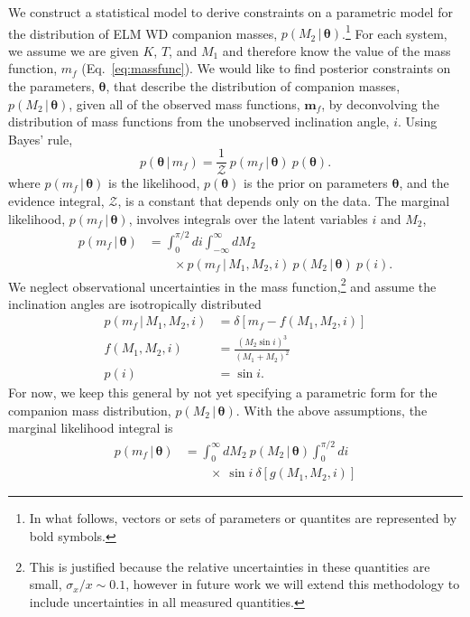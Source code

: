 \documentclass[apjl]{emulateapj}
\newcommand{\given}{\,|\,}
\newcommand{\bs}[1]{\boldsymbol{#1}}
\begin{document}
We construct a statistical model to derive constraints on a parametric model for the distribution of ELM WD companion masses, $p(M_2 \given \bs{\theta})$.\footnote{In what follows, vectors or sets of parameters or quantites are represented by bold symbols.} For each system, we assume we are given $K$, $T$, and $M_1$ and therefore know the value of the mass function, $m_f$ (Eq.~\ref{eq:massfunc}). We would like to find posterior constraints on the parameters, $\bs{\theta}$, that describe the distribution of companion masses, $p(M_2\given \bs{\theta})$, given all of the observed mass functions, $\bs{m}_f$, by deconvolving the distribution of mass functions from the unobserved inclination angle, $i$. Using Bayes' rule,
\begin{equation}
    p(\bs{\theta} \given m_f) = \frac{1}{\mathcal{Z}}~p(m_f \given \bs{\theta})~p(\bs{\theta}).
\end{equation}
where $p(m_f \given \bs{\theta})$ is the likelihood, $p(\bs{\theta})$ is the prior on parameters $\bs{\theta}$, and the evidence integral, $\mathcal{Z}$, is a constant that depends only on the data. The marginal likelihood, $p(m_f \given \bs{\theta})$, involves integrals over the latent variables $i$ and $M_2$,
\begin{align}
    p(m_f \given \bs{\theta}) &= \int_0^{\pi/2} di \int_{-\infty}^\infty dM_2  \nonumber \\
      & \qquad {} \times p(m_f \given M_1, M_2, i)~p(M_2 \given \bs{\theta})~p(i).
\end{align}
We neglect observational uncertainties in the mass function,\footnote{This is justified because the relative uncertainties in these quantities are small, $\sigma_x / x \sim 0.1$, however in future work we will extend this methodology to include uncertainties in all measured quantities.} and assume the inclination angles are isotropically distributed
\begin{align}
	p(m_f \given M_1, M_2, i) &= \delta \left[m_f - f(M_1, M_2, i) \right]\\
	f(M_1, M_2, i) &= \frac{(M_2 \sin i)^3}{(M_1 + M_2)^2}\\
	p(i) &= \sin i.
\end{align}
For now, we keep this general by not yet specifying a parametric form for the companion mass distribution, $p(M_2 \given \bs{\theta})$. With the above assumptions, the marginal likelihood integral is
\begin{align}
    p(m_f \given \bs{\theta}) &= \int_{0}^\infty dM_2 ~p(M_2 \given \bs{\theta}) \int_0^{\pi/2} di  \nonumber \\
    & \qquad {} \times ~\sin i ~ \delta \left[g(M_1,M_2,i) \right]\label{eq:delta}
\end{align}
\end{document}
